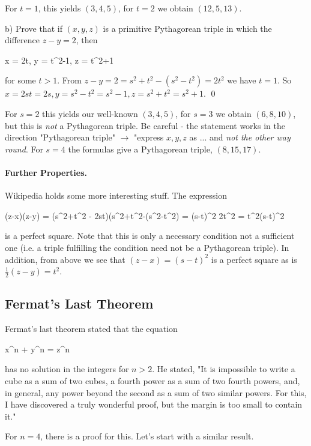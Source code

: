 For $t=1$, this yields $(3,4,5)$, for $t=2$ we obtain $(12, 5, 13)$.

b) Prove that if $(x , y, z)$ is a primitive Pythagorean triple in which the difference $z-y = 2$, then

\bee
x = 2t, \quad y = t^2-1, \quad z = t^2+1
\eee

for some $t > 1$. From $z - y = 2 = s^2+t^2 - (s^2 - t^2) = 2t^2$ we have $t = 1$. So $x = 2st = 2s, y = s^2-t^2 = s^2-1, z = s^2 + t^2 = s^2 + 1$. \qed

For $s=2$ this yields our well-known $(3,4,5)$, for $s=3$ we obtain $(6,8,10)$, but this is \emph{not} a Pythagorean triple. Be careful - the statement works in the direction "Pythagorean triple" $\rightarrow$ "express $x,y,z$ as ... and \emph{not the other way round}. For $s=4$ the formulas give a Pythagorean triple, $(8, 15, 17)$.

\paragraph{Further Properties.} Wikipedia holds some more interesting stuff. The expression

\bee
{}(z-x)(z-y) = (s^2+t^2 - 2st)(s^2+t^2-(s^2-t^2) =  (s-t)^2 2t^2 = t^2(s-t)^2
\eee

is a perfect square. Note that this is only a necessary condition not a sufficient one (i.e. a triple fulfilling the condition need not be a Pythagorean triple). In addition, from above we see that $(z-x) = (s-t)^2$ is a perfect square as is $\frac{1}{2}(z-y) = t^2$.



\subsection{Fermat's Last Theorem}

Fermat's last theorem stated that the equation

\bee
x^n + y^n = z^n
\eee

has no solution in the integers for $n > 2$. He stated, "It is impossible to write a cube as a sum of two cubes, a fourth power as a sum of two fourth powers, and, in general, any power beyond the second as a sum of two similar powers. For this, I have discovered a truly wonderful proof, but the margin is too small to contain it."

For $n=4$, there is a proof for this. Let's start with a similar result.

